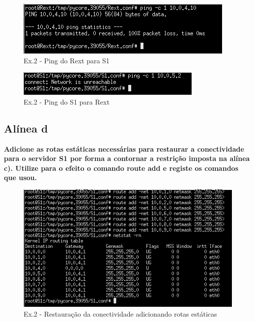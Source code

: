 \documentclass[a4paper]{report}
\begin{document}
\begin{figure}[H]
    \centering 
    \includegraphics[width=\textwidth]{images/pingRextS1.png}
    \caption{Ex.2 - Ping do Rext para S1}
    \label{fig:pingRextS1}
\end{figure}

\begin{figure}[H]
    \centering 
    \includegraphics[width=\textwidth]{images/pingS1Rext.png}
    \caption{Ex.2 - Ping do S1 para Rext}
    \label{fig:pingS1Rext}
\end{figure}

\subsection{Alínea d}
\textbf{Adicione as rotas estáticas necessárias para restaurar a conectividade
para o servidor S1 por forma a contornar a restrição imposta na alínea c). Utilize
para o efeito o comando route add e registe os comandos que usou.}

\begin{figure}[H]
    \centering 
    \includegraphics[width=\textwidth]{images/routeAdd.png}
    \caption{Ex.2 - Restauração da conectividade adicionando rotas estáticas}
    \label{fig:routeAdd}
\end{figure}
\end{document}
